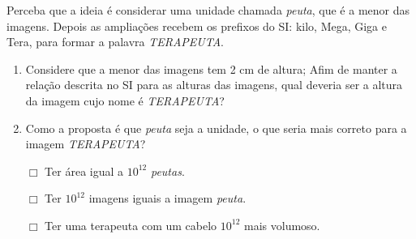 Perceba que a ideia é considerar uma unidade chamada \textit{peuta}, que é a menor das imagens. Depois as ampliações recebem os prefixos do SI: kilo, Mega, Giga e Tera, para formar a palavra \textit{TERAPEUTA}.
\begin{enumerate}
\item {} 
Considere que a menor das imagens tem 2 cm de altura; Afim de manter a relação descrita no SI para as alturas das imagens, qual deveria ser a altura da imagem cujo nome é \textit{TERAPEUTA}?

\item {} 
Como a proposta é que \textit{peuta} seja a unidade, o que seria mais correto para a imagem \textit{TERAPEUTA}?

\(\Box\) Ter área igual a \(10^{12}\) \textit{peutas}.

\(\Box\) Ter \(10^{12}\) imagens iguais a imagem \textit{peuta}.

\(\Box\) Ter uma terapeuta com um cabelo \(10^{12}\) mais volumoso.

\end{enumerate}

